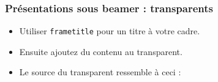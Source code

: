 \begin{frame}
  \frametitle{Présentations sous beamer : transparents}
  \begin{itemize}
    \item Utiliser \texttt{frametitle} pour un titre à votre cadre.
    \item Ensuite ajoutez du contenu au transparent.
    \item Le source du transparent ressemble à ceci :
  \end{itemize}
\end{frame}

